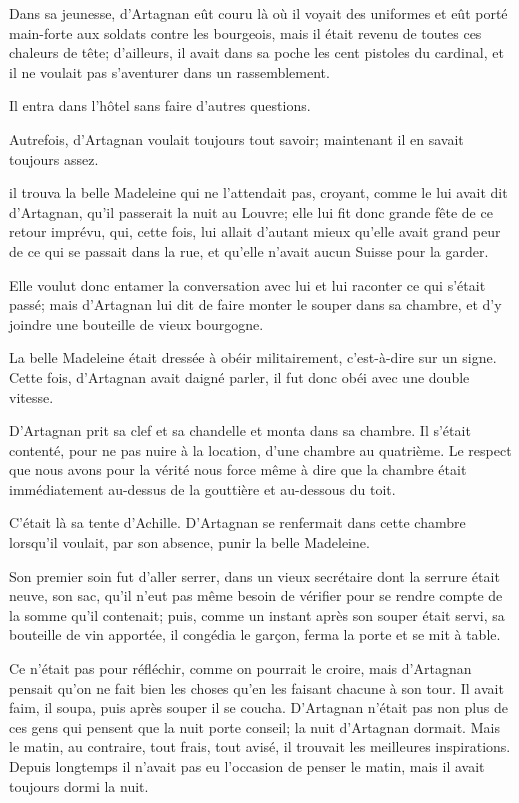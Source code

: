 Dans sa jeunesse, d'Artagnan eût couru là où il voyait des uniformes et eût porté main-forte aux soldats contre les bourgeois, mais il était revenu de toutes ces chaleurs de tête; d'ailleurs, il avait dans sa poche les cent pistoles du cardinal, et il ne voulait pas s'aventurer dans un rassemblement.

Il entra dans l'hôtel sans faire d'autres questions.

Autrefois, d'Artagnan voulait toujours tout savoir; maintenant il en savait toujours assez.

il trouva la belle Madeleine qui ne l'attendait pas, croyant, comme le lui avait dit d'Artagnan, qu'il passerait la nuit au Louvre; elle lui fit donc grande fête de ce retour imprévu, qui, cette fois, lui allait d'autant mieux qu'elle avait grand peur de ce qui se passait dans la rue, et qu'elle n'avait aucun Suisse pour la garder.

Elle voulut donc entamer la conversation avec lui et lui raconter ce qui s'était passé; mais d'Artagnan lui dit de faire monter le souper dans sa chambre, et d'y joindre une bouteille de vieux bourgogne.

La belle Madeleine était dressée à obéir militairement, c'est-à-dire sur un signe. Cette fois, d'Artagnan avait daigné parler, il fut donc obéi avec une double vitesse.

D'Artagnan prit sa clef et sa chandelle et monta dans sa chambre. Il s'était contenté, pour ne pas nuire à la location, d'une chambre au quatrième. Le respect que nous avons pour la vérité nous force même à dire que la chambre était immédiatement au-dessus de la gouttière et au-dessous du toit.

C'était là sa tente d'Achille. D'Artagnan se renfermait dans cette chambre lorsqu'il voulait, par son absence, punir la belle Madeleine.

Son premier soin fut d'aller serrer, dans un vieux secrétaire dont la serrure était neuve, son sac, qu'il n'eut pas même besoin de vérifier pour se rendre compte de la somme qu'il contenait; puis, comme un instant après son souper était servi, sa bouteille de vin apportée, il congédia le garçon, ferma la porte et se mit à table.

Ce n'était pas pour réfléchir, comme on pourrait le croire, mais d'Artagnan pensait qu'on ne fait bien les choses qu'en les faisant chacune à son tour. Il avait faim, il soupa, puis après souper il se coucha. D'Artagnan n'était pas non plus de ces gens qui pensent que la nuit porte conseil; la nuit d'Artagnan dormait. Mais le matin, au contraire, tout frais, tout avisé, il trouvait les meilleures inspirations. Depuis longtemps il n'avait pas eu l'occasion de penser le matin, mais il avait toujours dormi la nuit.

